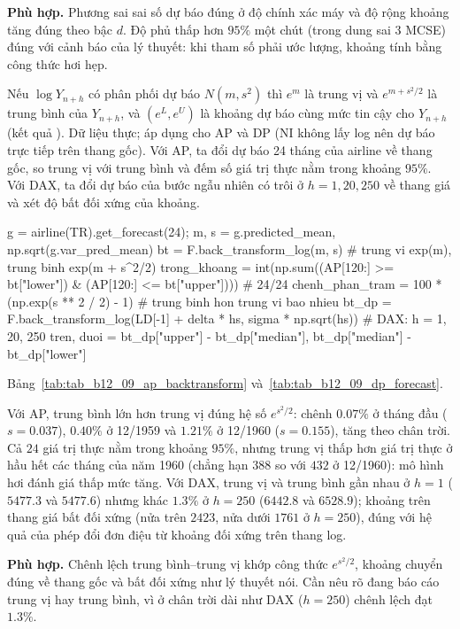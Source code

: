  \textbf{Phù hợp.} Phương sai sai số dự báo đúng ở độ chính xác máy và độ rộng khoảng tăng đúng theo bậc $d$. Độ phủ thấp hơn $95\%$ một chút (trong dung sai $3$ MCSE) đúng với cảnh báo của lý thuyết: khi tham số phải ước lượng, khoảng tính bằng công thức hơi hẹp.

 Nếu $\log Y_{n+h}$ có phân phối dự báo $N(m,s^2)$ thì $e^m$ là trung vị và $e^{m+s^2/2}$ là trung bình của $Y_{n+h}$, và $(e^L,e^U)$ là khoảng dự báo cùng mức tin cậy cho $Y_{n+h}$ (kết quả ).
 Dữ liệu thực; áp dụng cho AP và DP (NI không lấy log nên dự báo trực tiếp trên thang gốc). Với AP, ta đổi dự báo 24 tháng của airline về thang gốc, so trung vị với trung bình và đếm số giá trị thực nằm trong khoảng $95\%$. Với DAX, ta đổi dự báo của bước ngẫu nhiên có trôi ở $h=1,20,250$ về thang giá và xét độ bất đối xứng của khoảng.
\begin{codeblock}
g = airline(TR).get_forecast(24); m, s = g.predicted_mean, np.sqrt(g.var_pred_mean)
bt = F.back_transform_log(m, s)               # trung vi exp(m), trung binh exp(m + s^2/2)
trong_khoang = int(np.sum((AP[120:] >= bt["lower"]) & (AP[120:] <= bt["upper"])))   # 24/24
chenh_phan_tram = 100 * (np.exp(s ** 2 / 2) - 1)     # trung binh hon trung vi bao nhieu %
bt_dp = F.back_transform_log(LD[-1] + delta * hs, sigma * np.sqrt(hs))   # DAX: h = 1, 20, 250
tren, duoi = bt_dp["upper"] - bt_dp["median"], bt_dp["median"] - bt_dp["lower"]
\end{codeblock}
 Bảng~\ref{tab:tab_b12_09_ap_backtransform} và~\ref{tab:tab_b12_09_dp_forecast}.


 Với AP, trung bình lớn hơn trung vị đúng hệ số $e^{s^2/2}$: chênh $0.07\%$ ở tháng đầu ($s=0.037$), $0.40\%$ ở 12/1959 và $1.21\%$ ở 12/1960 ($s=0.155$), tăng theo chân trời. Cả $24$ giá trị thực nằm trong khoảng $95\%$, nhưng trung vị thấp hơn giá trị thực ở hầu hết các tháng của năm 1960 (chẳng hạn $388$ so với $432$ ở 12/1960): mô hình hơi đánh giá thấp mức tăng. Với DAX, trung vị và trung bình gần nhau ở $h=1$ ($5477.3$ và $5477.6$) nhưng khác $1.3\%$ ở $h=250$ ($6442.8$ và $6528.9$); khoảng trên thang giá bất đối xứng (nửa trên $2423$, nửa dưới $1761$ ở $h=250$), đúng với hệ quả của phép đổi đơn điệu từ khoảng đối xứng trên thang log.

 \textbf{Phù hợp.} Chênh lệch trung bình--trung vị khớp công thức $e^{s^2/2}$, khoảng chuyển đúng về thang gốc và bất đối xứng như lý thuyết nói. Cần nêu rõ đang báo cáo trung vị hay trung bình, vì ở chân trời dài như DAX ($h=250$) chênh lệch đạt $1.3\%$.

